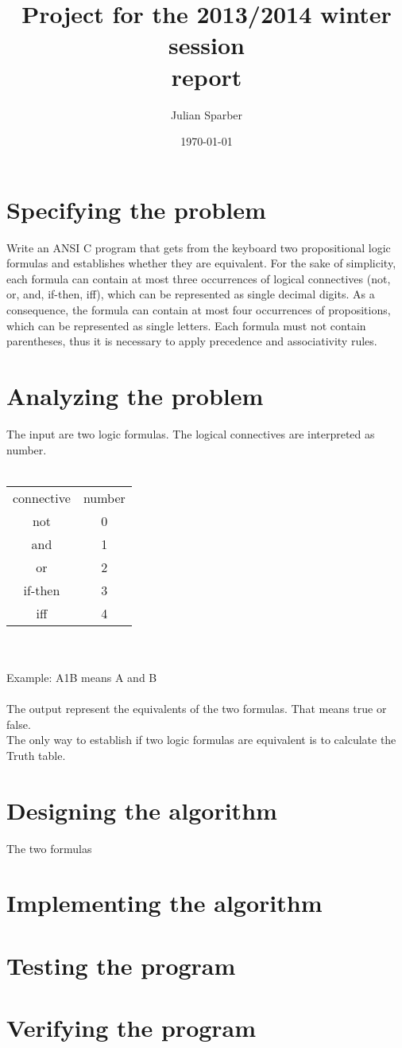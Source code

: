 \documentclass[11pt, a4paper, titlepage, block]{article}
\title{\textbf{Project for the 2013/2014 winter session\\ report}}
\author{Julian Sparber}
\date{\today}
\begin{document}
\maketitle
\section{Specifying the problem}
	Write an ANSI C program that gets from the keyboard two propositional logic formulas and
	establishes whether they are equivalent. For the sake of simplicity, each formula can contain at
	most three occurrences of logical connectives (not, or, and, if-then, iff), which can be represented
	as single decimal digits. As a consequence, the formula can contain at most four occurrences of
	propositions, which can be represented as single letters. Each formula must not contain parentheses,
	thus it is necessary to apply precedence and associativity rules.
	\newpage
\section{Analyzing the problem}
	The input are two logic formulas. The logical connectives are interpreted as number. \\
	\\
	\begin{tabular}{cc}
	connective & number\\
		not & 0\\
		and & 1\\
		or & 2\\
		if-then & 3\\
		iff & 4\\
	\end{tabular}\\
	\\
	Example: A1B means A and B\\
	\\ 
	The output represent the equivalents of the two formulas. That means true or false.\\
	The only way to establish if two logic formulas are equivalent is to calculate the Truth table.
					
\section{Designing the algorithm}
	The two formulas 
\section{Implementing the algorithm}
\section{Testing the program}
\section{Verifying the program}
\end{document}
